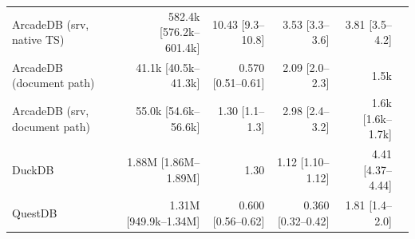 \begin{tabular}{lrrrrr}
ArcadeDB (srv, native TS) & 582.4k [576.2k--601.4k] & 10.43 [9.3--10.8] & 3.53 [3.3--3.6] & 3.81 [3.5--4.2] & \\
ArcadeDB (document path) & 41.1k [40.5k--41.3k] & 0.570 [0.51--0.61] & 2.09 [2.0--2.3] & 1.5k & \\
ArcadeDB (srv, document path) & 55.0k [54.6k--56.6k] & 1.30 [1.1--1.3] & 2.98 [2.4--3.2] & 1.6k [1.6k--1.7k] & \\
DuckDB & 1.88M [1.86M--1.89M] & 1.30 & 1.12 [1.10--1.12] & 4.41 [4.37--4.44] & \\
QuestDB & 1.31M [949.9k--1.34M] & 0.600 [0.56--0.62] & 0.360 [0.32--0.42] & 1.81 [1.4--2.0] & \\
\bottomrule
\end{tabular}
